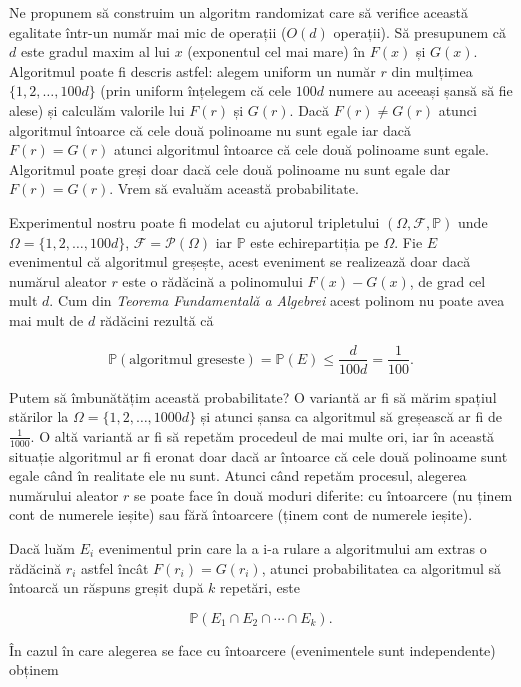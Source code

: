 \documentclass[]{article}
\begin{document}
Ne propunem să construim un algoritm randomizat care să verifice această
egalitate într-un număr mai mic de operații (\(O(d)\) operații). Să
presupunem că \(d\) este gradul maxim al lui \(x\) (exponentul cel mai
mare) în \(F(x)\) și \(G(x)\). Algoritmul poate fi descris astfel:
alegem uniform un număr \(r\) din mulțimea \(\{1,2,\ldots,100d\}\) (prin
uniform înțelegem că cele \(100d\) numere au aceeași șansă să fie alese)
și calculăm valorile lui \(F(r)\) și \(G(r)\). Dacă \(F(r)\neq G(r)\)
atunci algoritmul întoarce că cele două polinoame nu sunt egale iar dacă
\(F(r)=G(r)\) atunci algoritmul întoarce că cele două polinoame sunt
egale. Algoritmul poate greși doar dacă cele două polinoame nu sunt
egale dar \(F(r)=G(r)\). Vrem să evaluăm această probabilitate.

Experimentul nostru poate fi modelat cu ajutorul tripletului
\((\Omega, \mathcal{F}, \mathbb{P})\) unde
\(\Omega = \{1,2,\ldots,100d\}\), \(\mathcal{F}=\mathcal{P}(\Omega)\)
iar \(\mathbb{P}\) este echirepartiția pe \(\Omega\). Fie \(E\)
evenimentul că algoritmul greșește, acest eveniment se realizează doar
dacă numărul aleator \(r\) este o rădăcină a polinomului \(F(x)-G(x)\),
de grad cel mult \(d\). Cum din \emph{Teorema Fundamentală a Algebrei}
acest polinom nu poate avea mai mult de \(d\) rădăcini rezultă că

\[
  \mathbb{P}(\text{algoritmul greseste}) = \mathbb{P}(E) \leq \frac{d}{100d} = \frac{1}{100}.
\]

Putem să îmbunătățim această probabilitate? O variantă ar fi să mărim
spațiul stărilor la \(\Omega = \{1,2,\ldots,1000d\}\) și atunci șansa ca
algoritmul să greșească ar fi de \(\frac{1}{1000}\). O altă variantă ar
fi să repetăm procedeul de mai multe ori, iar în această situație
algoritmul ar fi eronat doar dacă ar întoarce că cele două polinoame
sunt egale când în realitate ele nu sunt. Atunci când repetăm procesul,
alegerea numărului aleator \(r\) se poate face în două moduri diferite:
cu întoarcere (nu ținem cont de numerele ieșite) sau fără întoarcere
(ținem cont de numerele ieșite).

Dacă luăm \(E_i\) evenimentul prin care la a i-a rulare a algoritmului
am extras o rădăcină \(r_i\) astfel încât \(F(r_i)=G(r_i)\), atunci
probabilitatea ca algoritmul să întoarcă un răspuns greșit după \(k\)
repetări, este

\[
  \mathbb{P}(E_1\cap E_2\cap \cdots\cap E_k).
\]

În cazul în care alegerea se face cu întoarcere (evenimentele sunt
independente) obținem
\end{document}
